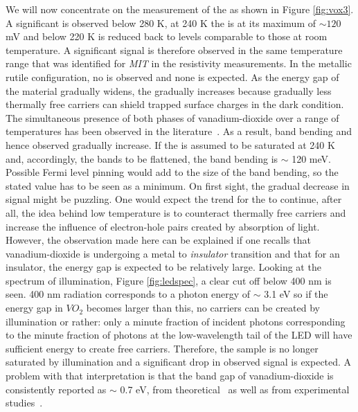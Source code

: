 We will now concentrate on the measurement of the \spv{} as shown in Figure \ref{fig:vox3}. A significant \spv{} is observed below 280 K, at 240 K the \spv{} is at its maximum of $\sim 120$ mV and below 220 K \spv{} is reduced back to levels comparable to those at room temperature. A significant \spv{} signal is therefore observed in the same temperature range that was identified for \emph{MIT} in the resistivity measurements. In the metallic rutile configuration, no \spv{} is observed and none is expected. As the energy gap of the material gradually widens, the \spv{} gradually increases because gradually less thermally free carriers can shield trapped surface charges in the dark condition. The simultaneous presence of both phases of vanadium-dioxide over a range of temperatures has been observed in the literature~\cite{pergament_mixphase}. As a result, band bending and hence observed \spv{} gradually increase. If the \spv{} is assumed to be saturated at 240 K and, accordingly, the bands to be flattened, the band bending is $\sim$ 120 meV. Possible Fermi level pinning would add to the size of the band bending, so the stated value has to be seen as a minimum. On first sight, the gradual decrease in \spv{} signal might be puzzling. One would expect the trend for the \spv{} to continue, after all, the idea behind low temperature \spv{} is to counteract thermally free carriers and increase the influence of electron-hole pairs created by absorption of light. However, the observation made here can be explained if one recalls that vanadium-dioxide is undergoing a metal to \emph{insulator} transition and that for an insulator, the energy gap is expected to be relatively large. Looking at the spectrum of illumination, Figure \ref{fig:ledspec}, a clear cut off below 400 nm is seen. 400 nm radiation corresponds to a photon energy of $\sim$ 3.1 eV so if the energy gap in $VO_2$ becomes larger than this, no carriers can be created by illumination or rather: only a minute fraction of incident photons corresponding to the minute fraction of photons at the low-wavelength tail of the LED will have sufficient energy to create free carriers. Therefore, the sample is no longer saturated by illumination and a significant drop in observed \spv{} signal is expected. A problem with that interpretation is that the band gap of vanadium-dioxide is consistently reported as $\sim$ 0.7 eV, from theoretical~\cite{biermann_theogap} as well as from experimental studies~\cite{garcia_expgap,jensen_expgap,koethe_expstud,merenda_expgap}.\\
